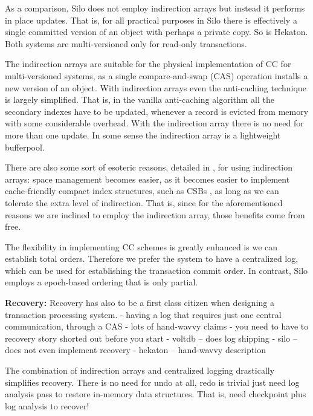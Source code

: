 As a comparison, Silo does not employ indirection arrays but instead it performs in place updates. That is, for all practical purposes in Silo there is effectively a single committed version of an object with perhaps a private copy. So is Hekaton. Both systems are multi-versioned only for read-only transactions.

The indirection arrays are suitable for the physical implementation of CC for multi-versioned systems, as a single compare-and-swap (CAS) operation installs a new version of an object. 
With indirection arrays even the anti-caching technique \cite{DeBrabantPTSZ13} is largely simplified. That is, in the vanilla anti-caching algorithm all the secondary indexes have to be updated, whenever a record is evicted from memory with some considerable overhead. With the indirection array there is no need for more than one update. 
In some sense the indirection array is a lightweight bufferpool. 

There are also some sort of esoteric reasons, detailed in , for using indirection arrays: space management becomes easier, as it becomes easier to implement cache-friendly compact index structures, such as CSBs \cite{RaoR00}, as long as we can tolerate the extra level of indirection. That is, since for the aforementioned reasons we are inclined to employ the indirection array, those benefits  come from free. 

The flexibility in implementing CC schemes is greatly enhanced is we can establish total orders. Therefore we prefer the system to have a centralized log, which can be used for establishing the transaction commit order. 
In contrast, Silo employs a epoch-based ordering that is only partial. 

\vspace{2mm}
{\bf Recovery:} 
Recovery has also to be a first class citizen when designing a transaction processing system.
- having a log that requires just one central communication, through a CAS
- lots of hand-wavvy claims
- you need to have to recovery story shorted out before you start
- voltdb -- does log shipping
- silo -- does not even implement recovery
- hekaton -- hand-wavvy description


The combination of indirection arrays and centralized logging drastically simplifies recovery. There is no need for undo at all, redo is trivial just need log analysis pass to restore in-memory data structures. That is, need checkpoint plus log analysis to recover!

